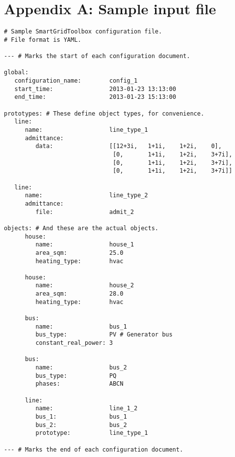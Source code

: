 \documentclass[12pt]{article}
\begin{document}
\section{Appendix A: Sample input file}
\begin{verbatim}
# Sample SmartGridToolbox configuration file.
# File format is YAML.

--- # Marks the start of each configuration document.

global:
   configuration_name:        config_1
   start_time:                2013-01-23 13:13:00
   end_time:                  2013-01-23 15:13:00

prototypes: # These define object types, for convenience.
   line:
      name:                   line_type_1 
      admittance:             
         data:                [[12+3i,   1+1i,    1+2i,    0],
                               [0,       1+1i,    1+2i,    3+7i],
                               [0,       1+1i,    1+2i,    3+7i],
                               [0,       1+1i,    1+2i,    3+7i]]
   
   line:
      name:                   line_type_2
      admittance:
         file:                admit_2 

objects: # And these are the actual objects.
      house:
         name:                house_1
         area_sqm:            25.0
         heating_type:        hvac

      house:
         name:                house_2
         area_sqm:            28.0
         heating_type:        hvac

      bus:
         name:                bus_1
         bus_type:            PV # Generator bus
         constant_real_power: 3

      bus:
         name:                bus_2
         bus_type:            PQ 
         phases:              ABCN

      line:
         name:                line_1_2
         bus_1:               bus_1
         bus_2:               bus_2
         prototype:           line_type_1

--- # Marks the end of each configuration document.
\end{verbatim}

%
%
\end{document}
